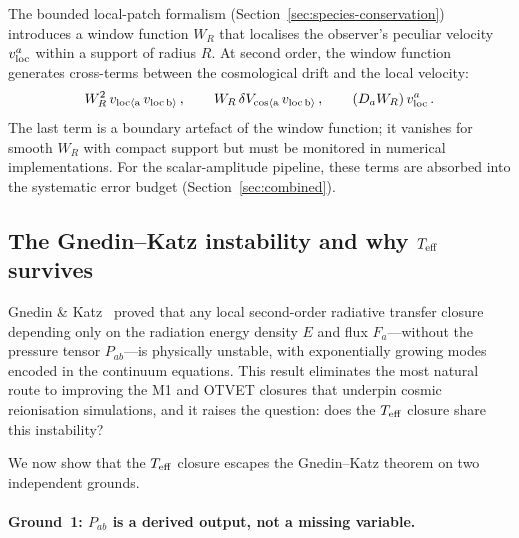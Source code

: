 The bounded local-patch formalism
(Section~\ref{sec:species-conservation}) introduces
a window function $W_R$ that localises the observer's
peculiar velocity $v_{\rm loc}^a$ within a support of
radius $R$.  At second order, the window function
generates cross-terms between the cosmological drift
and the local velocity:
\begin{equation}\label{eq:local-patch-2nd}
W_R^2\,
v_{\rm loc\langle a}\,
v_{\rm loc\, b\rangle}\,,
\qquad
W_R\,
\delta V_{\rm cos\langle a}\,
v_{\rm loc\, b\rangle}\,,
\qquad
(D_a W_R)\, v_{\rm loc}^a\,.
\end{equation}
The last term is a boundary artefact of the window
function; it vanishes for smooth $W_R$ with compact
support but must be monitored in numerical
implementations.  For the scalar-amplitude pipeline,
these terms are absorbed into the systematic error
budget (Section~\ref{sec:combined}).


\subsection{The Gnedin--Katz instability and why $T_{\mathrm{eff}}$
  survives}
\label{sec:gnedin-katz}

Gnedin \& Katz~\cite{GnedinKatz2026} proved that any
local second-order radiative transfer closure depending
only on the radiation energy density $E$ and flux
$F_a$---without the pressure tensor $P_{ab}$---is
physically unstable, with exponentially growing modes
encoded in the continuum equations.  This result
eliminates the most natural route to improving the M1
and OTVET closures that underpin cosmic reionisation
simulations, and it raises the question: does the $T_{\mathrm{eff}}$
closure share this instability?

We now show that the $T_{\mathrm{eff}}$ closure escapes the
Gnedin--Katz theorem on two independent grounds.


\paragraph{Ground~1: $P_{ab}$ is a derived output, not
a missing variable.}

